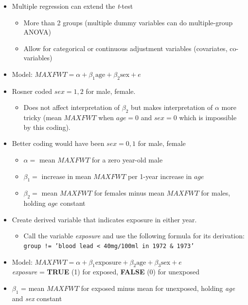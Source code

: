 \documentclass[14pt]{extarticle}
\begin{document}
\begin{itemize}
    \item Multiple regression can extend the \textit{t}-test
    \begin{itemize}
        \item More than 2 groups (multiple dummy variables can do multiple-group ANOVA)
        \item Allow for categorical or continuous adjustment variables (covariates, co-variables)
    \end{itemize}

    \item Model: $MAXFWT = \alpha + \beta_1 \text{age} + \beta_2 \text{sex} + e$
    
    \item Rosner coded $sex = 1, 2$ for male, female.
    \begin{itemize}
        \item Does not affect interpretation of $\beta_2$ but makes interpretation of $\alpha$ more tricky (mean $MAXFWT$ when $age = 0$ and $sex = 0$ which is impossible by this coding).
    \end{itemize}
    
    \item Better coding would have been $sex = 0, 1$ for male, female
    \begin{itemize}
        \item $\alpha = $ mean $MAXFWT$ for a zero year-old male
        \item $\beta_1 = $ increase in mean $MAXFWT$ per 1-year increase in $age$
        \item $\beta_2 = $ mean $MAXFWT$ for females minus mean $MAXFWT$ for males, holding $age$ constant
    \end{itemize}
    
    \item Create derived variable that indicates exposure in either year.
    \begin{itemize}
        \item Call the variable \textit{exposure} and use the following formula for its derivation: \\
        \texttt{group != 'blood lead < 40mg/100ml in 1972 \& 1973'}
    \end{itemize}

    \item Model: $MAXFWT = \alpha + \beta_1 \text{exposure} + \beta_2 \text{age} + \beta_3 \text{sex} + e$ \\
    \textit{exposure} = \textbf{TRUE} (1) for exposed, \textbf{FALSE} (0) for unexposed
    \item $\beta_1$ = mean $MAXFWT$ for exposed minus mean for unexposed, holding \textit{age} and \textit{sex} constant
\end{itemize}
\end{document}
